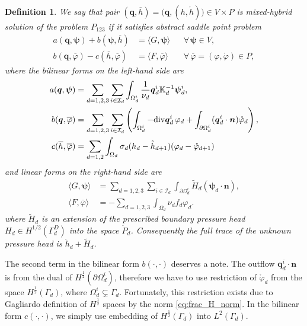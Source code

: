 \documentclass[times]{nlaauth}%
\def\div{{\rm div}}
\def\vc#1{\mathbf{\boldsymbol{#1}}}     %
\def\tn#1{{\mathbb{#1}}}    %
\def\ol#1{\overline{#1}}
\def\prtl{\partial}                                        %
\def\phi{\varphi}
\newtheorem{definition}[theorem]{Definition}
\begin{document}
\begin{definition}
\label{MH-sol}
We say that pair $(\vc{q}, \ol{h})=\big(\vc{q},(h,\mathring{h})\big)\in V\times P$ is mixed-hybrid solution of the problem $P_{123}$
if it satisfies abstract saddle point problem
\begin{align}
        \label{Saddle1}
    a(\vc{q},\vc \psi) + b(\vc\psi, \ol{h}) 
    &= \langle G, \vc \psi\rangle &&\forall\, \vc\psi\in V,\\
        \label{Saddle2}
 b(\vc{q}, \ol\phi) - c(\ol{h},\ol\phi) &= \langle F, \ol\phi \rangle &&\forall\, \ol\phi=(\phi, \mathring{\phi}) \in P,
\end{align}
where the bilinear forms on the left-hand side are
\begin{align*}
 a(\vc q, \vc \psi)&=\sum_{d=1,2,3}\sum_{i\in \mathcal{I}_d} \int_{\Omega_d^i}
   \frac{1}{\nu_d} \vc q_d^i \tn K_d^{-1} \vc \psi_d^i,\\
%
 b(\vc q, \ol\phi)&=\sum_{d=1,2,3}\sum_{i\in \mathcal{I}_d} 
        \left(
        \int_{\Omega_d^i} -\div\vc q_d^i\, \phi_d
        +\int_{\prtl\Omega_d^i}
                 (\vc q_d^i \cdot \vc n)\mathring{\phi}_d
        \right),\\
%
 c(\ol{h},\ol\phi)&=\sum_{d=1,2}           
          \int_{\Omega_{d}}
               \sigma_{d}(h_{d}-\mathring{h}_{d+1})(\phi_{d}-\mathring{\phi}_{d+1})
\end{align*}
and linear forms on the right-hand side are
\begin{align*}
 \langle G, \vc\psi\rangle &= \sum_{d=1,2,3} \sum_{i\in \mathcal{I}_d} 
           \int_{\prtl\Omega_d^i} \tilde H_d(\vc\psi_d\cdot\vc n),\\ 
%             
 \langle F, \ol\phi\rangle &= -\sum_{d=1,2,3}\int_{\Omega_d} \nu_d f_d \phi_d .
%
\end{align*}
where $\tilde H_d$ is an extension of the prescribed boundary pressure head $H_d\in H^{1/2}(\Gamma_d^D)$ into 
the space $\mathring{P}_d$. Consequently the full trace of the unknown pressure head is 
$\mathring{h}_d+\tilde H_d$.
\end{definition}

The second term in the bilinear form $b(\cdot,\cdot)$ deserves a note. The outflow 
$\vc q_d^i \cdot \vc n$ is from the dual of $H^{\frac12}(\prtl\Omega_d^i)$, therefore we have
to use restriction of $\mathring \phi_d$ from the space  $H^{\frac12}(\Gamma_d)$, where $\Omega_d^i \subsetneq \Gamma_d$. 
Fortunately, this restriction exists due to Gagliardo definition of $H^{\frac12}$ spaces by the norm \eqref{eq:frac_H_norm}.
In the bilinear form $c(\cdot,\cdot)$, we simply use embedding of $H^{\frac12}(\Gamma_d)$ into $L^2(\Gamma_d)$.
\end{document}

